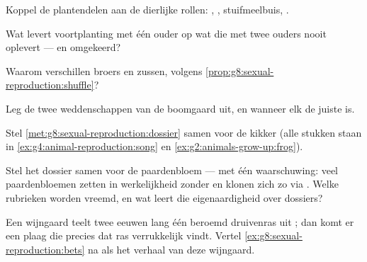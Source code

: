 \begin{exercise}[$\star$]\label{exo:g8:sexual-reproduction:4}
Koppel de plantendelen aan de dierlijke rollen: , ,
stuifmeelbuis, .
\end{exercise}

\begin{exercise}[$\star$]\label{exo:g8:sexual-reproduction:5}
Wat levert voortplanting met één ouder op wat die met twee ouders nooit
oplevert --- en omgekeerd?
\end{exercise}

\begin{exercise}[$\star$]\label{exo:g8:sexual-reproduction:6}
Waarom verschillen broers en zussen, volgens
\cref{prop:g8:sexual-reproduction:shuffle}?
\end{exercise}

\begin{exercise}[$\star\star$]\label{exo:g8:sexual-reproduction:7}
Leg de twee weddenschappen van de boomgaard uit, en wanneer elk de juiste
is.
\end{exercise}

\begin{exercise}[$\star\star$]\label{exo:g8:sexual-reproduction:8}
Stel \cref{met:g8:sexual-reproduction:dossier} samen voor de kikker (alle
stukken staan in
\cref{ex:g4:animal-reproduction:song} en
\cref{ex:g2:animals-grow-up:frog}).
\end{exercise}

\begin{exercise}[$\star\star$]\label{exo:g8:sexual-reproduction:9}
Stel het dossier samen voor de paardenbloem --- met één waarschuwing: veel
paardenbloemen zetten in werkelijkheid  zonder  en klonen
zich zo via . Welke rubrieken worden vreemd, en wat leert die
eigenaardigheid over dossiers?
\end{exercise}

\begin{exercise}[$\star\star$]\label{exo:g8:sexual-reproduction:10}
Een wijngaard teelt twee eeuwen lang één beroemd druivenras uit ;
dan komt er een plaag die precies dat ras verrukkelijk vindt. Vertel
\cref{ex:g8:sexual-reproduction:bets} na als het verhaal van deze
wijngaard.
\end{exercise}

